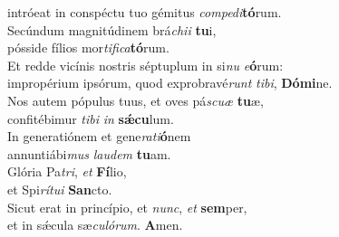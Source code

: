 \oddverse intróeat in conspéctu tuo gémitus \textit{com}\textit{pe}\textit{di}\textbf{tó}rum.\\
\evenverse Secúndum magnitúdinem brá\textit{chi}\textit{i} \textbf{tu}i,~\*\\
\evenverse pósside fílios mor\textit{ti}\textit{fi}\textit{ca}\textbf{tó}rum.\\
\oddverse Et redde vicínis nostris séptuplum in si\textit{nu} \textit{e}\textbf{ó}rum:~\*\\
\oddverse impropérium ipsórum, quod exprobravé\textit{runt} \textit{ti}\textit{bi}, \textbf{Dó}\textbf{mi}ne.\\
\evenverse Nos autem pópulus tuus, et oves pá\textit{scu}\textit{æ} \textbf{tu}æ,~\*\\
\evenverse confitébimur \textit{ti}\textit{bi} \textit{in} \textbf{sǽ}\textbf{cu}lum.\\
\oddverse In generatiónem et gene\textit{ra}\textit{ti}\textbf{ó}nem~\*\\
\oddverse annuntiábi\textit{mus} \textit{lau}\textit{dem} \textbf{tu}am.\\
\evenverse Glória Pa\textit{tri}, \textit{et} \textbf{Fí}lio,~\*\\
\evenverse et Spi\textit{rí}\textit{tu}\textit{i} \textbf{San}cto.\\
\oddverse Sicut erat in princípio, et \textit{nunc}, \textit{et} \textbf{sem}per,~\*\\
\oddverse et in sǽcula sæ\textit{cu}\textit{ló}\textit{rum}. \textbf{A}men.\\
